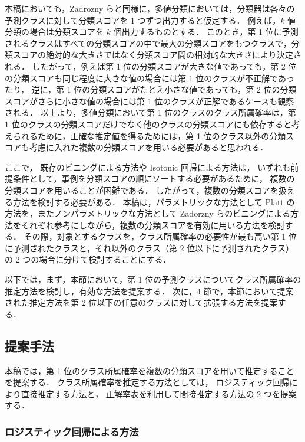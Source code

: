 \documentclass[japanese]{jnlp_1.4}
\begin{document}
本稿においても，Zadrozny らと同様に，多値分類においては，分類器は各々の予測クラスに対して分類スコアを 1 つずつ出力すると仮定する．
例えば，$k$ 値分類の場合は分類スコアを $k$ 個出力するものとする．
このとき，第 1 位に予測されるクラスはすべての分類スコアの中で最大の分類スコアをもつクラスで，分類スコアの絶対的な大きさではなく分類スコア間の相対的な大きさにより決定される．
したがって，例えば第 1 位の分類スコアが大きな値であっても，第 2 位の分類スコアも同じ程度に大きな値の場合には第 1 位のクラスが不正解であったり，
逆に，第 1 位の分類スコアがたとえ小さな値であっても，第 2 位の分類スコアがさらに小さな値の場合には第 1 位のクラスが正解であるケースも観察される．
以上より，多値分類において第 1 位のクラスのクラス所属確率は，第 1 位のクラスの分類スコアだけでなく他のクラスの分類スコアにも依存すると考えられるために，正確な推定値を得るためには，第 1 位のクラス以外の分類スコアも考慮に入れた複数の分類スコアを用いる必要があると思われる．

ここで，
既存のビニングによる方法や Isotonic 回帰による方法は，
いずれも前提条件として，事例を分類スコアの順にソートする必要があるために，
複数の分類スコアを用いることが困難である．
したがって，複数の分類スコアを扱える方法を検討する必要がある．
本稿は，パラメトリックな方法として Platt の方法を，またノンパラメトリックな方法として Zadorzny らのビニングによる方法をそれぞれ参考にしながら，複数の分類スコアを有効に用いる方法を検討する．
その際，対象とするクラスを，クラス所属確率の必要性が最も高い第 1 位に予測されたクラスと，それ以外のクラス（第 2 位以下に予測されたクラス）の 2 つの場合に分けて検討することにする．

以下では，まず，本節において，第 1 位の予測クラスについてクラス所属確率の推定方法を検討し，有効な方法を提案する．
次に，4 節で，本節において提案された推定方法を第 2 位以下の任意のクラスに対して拡張する方法を提案する．

\subsection{提案手法}\label{method}

本稿では，第 1 位のクラス所属確率を複数の分類スコアを用いて推定することを提案する．
クラス所属確率を推定する方法としては，
ロジスティック回帰により直接推定する方法と，
正解率表を利用して間接推定する方法の 2 つを提案する．

\subsubsection{ロジスティック回帰による方法}
\end{document}
